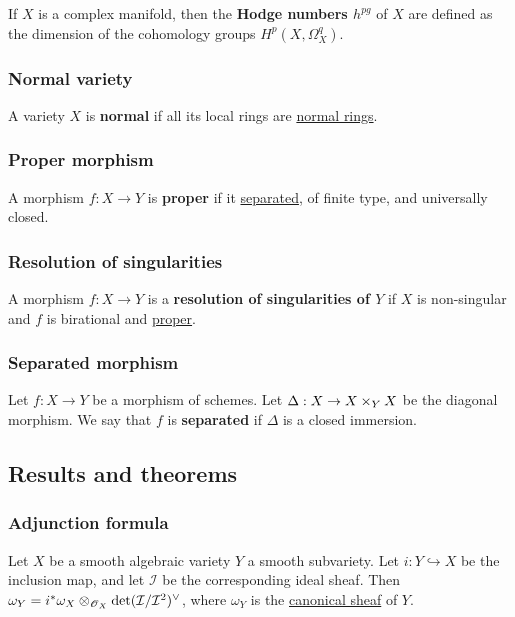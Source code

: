 \documentclass[11pt, english]{article}
\begin{document}
If $X$ is a complex manifold, then the \textbf{Hodge numbers $h^{pg}$} of $X$ are defined as the dimension of the cohomology groups $H^p(X,\Omega_X^q)$.

\subsubsection{Normal variety}
\label{normalvariety}
A variety $X$ is \textbf{normal} if all its local rings are \hyperref[normalring]{normal rings}.

\subsubsection{Proper morphism}
\label{proper}
A morphism $f:X \to Y$ is \textbf{proper} if it \hyperref[separated]{separated}, of finite type, and universally closed.

\subsubsection{Resolution of singularities}
\label{resolutionsing}

A morphism $f:X \to Y$ is a \textbf{resolution of singularities of $Y$} if $X$ is non-singular and $f$ is birational and \hyperref[proper]{proper}. 

\subsubsection{Separated morphism}
\label{separated}
Let $f:X \to Y$ be a morphism of schemes. Let $\Delta:X \to X \times_Y X$ be the diagonal morphism. We say that $f$ is \textbf{separated} if $\Delta$ is a closed immersion. 


\subsection{Results and theorems}
\subsubsection{Adjunction formula}
\label{adjunction}

Let $X$ be a smooth algebraic variety $Y$ a smooth subvariety. Let $i:Y \hookrightarrow X$ be the inclusion map, and let $\mathcal I$ be the corresponding ideal sheaf. Then $\omega_Y = i^\ast \omega_X \otimes_{\operatorname{\mathscr{O}}_X} \det(\mathcal I/\mathcal I^2)^\vee$, where $\omega_Y$ is the \hyperref[canonicalsheaf]{canonical sheaf} of $Y$.
\end{document}
